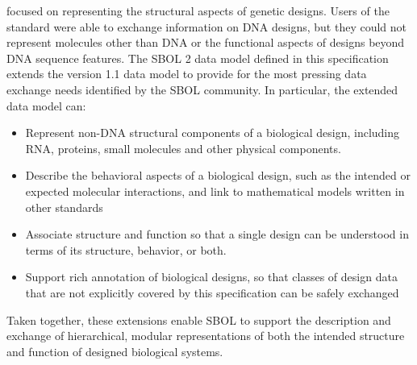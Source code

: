  focused on representing the structural aspects of genetic designs. Users of the standard were able to exchange information on DNA designs, but they could not represent molecules other than DNA or the functional aspects of designs beyond DNA sequence features. The SBOL 2 data model defined in this specification extends the version 1.1 data model to provide for the most pressing data exchange needs identified by the SBOL community. In particular, the extended data model can:
\begin{itemize}

\item Represent non-DNA structural components of a biological design, including RNA, proteins, small molecules and other physical components.

\item Describe the behavioral aspects of a biological design, such as the intended or expected molecular interactions, and link to mathematical models written in other standards

\item Associate structure and function so that a single design can be understood in terms of its structure, behavior, or both.

\item Support rich annotation of biological designs, so that classes of design data that are not explicitly covered by this specification can be safely exchanged

\end{itemize}
Taken together, these extensions enable SBOL to support the description and exchange of hierarchical, modular representations of both the intended structure and function of designed biological systems.


